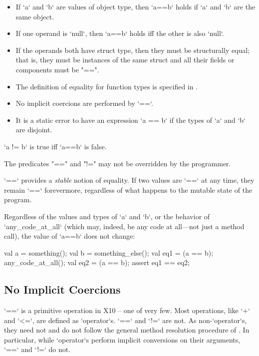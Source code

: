 \begin{itemize}
\item If \xcd`a` and \xcd`b` are values of object type, then \xcd`a==b` holds
      if \xcd`a` and \xcd`b` are the same object.
\item If one operand is \xcd`null`, then \xcd`a==b` holds iff the other is
      also \xcd`null`.
\item If the operands both have struct type, then they must be structurally equal;
that is, they must be instances of the same struct
and all their fields or components must be \xcd"==". 
\item The definition of equality for function types is specified in
      .
\item No implicit coercions are performed by \xcd`==`.  
\item It is a static error to have an expression \xcd`a == b` if the types of
      \xcd`a` and \xcd`b` are disjoint.  
\end{itemize}

\xcd`a != b`
is true iff \xcd`a==b` is false.

The predicates \xcd"==" and \xcd"!=" may not be overridden by the programmer.

\xcd`==` provides a {\em stable} notion of equality.  If two values are
\xcd`==` at any time, they remain \xcd`==` forevermore, regardless of what
happens to the mutable state of the program. 

\begin{ex}
Regardless of the values and types of \xcd`a` and \xcd`b`, 
or the behavior of \xcd`any_code_at_all` (which may, indeed, be
any code at all---not just a method call), the value of 
\xcd`a==b` does not change: 
\begin{xten}
val a = something();
val b = something_else();
val eq1 = (a == b);
any_code_at_all();
val eq2 = (a == b);
assert eq1 == eq2;
\end{xten}
\end{ex}

\subsection{No Implicit Coercions}
\label{sect:eqeq-no-coerce}

\xcd`==` is a primitive operation in X10 -- one of very few. Most operations,
like \xcd`+` and \xcd`<=`, are defined as \xcd`operator`s. \xcd`==` and
\xcd`!=` are not. As non-\xcd`operator`s, they need not and do not follow the
general method resolution procedure of . In
particular, while \xcd`operator`s perform implicit conversions on their
arguments, \xcd`==` and \xcd`!=` do not.

